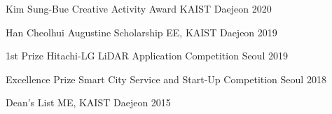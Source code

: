 \begin{cvhonors}

  \cvhonor
    {Kim Sung-Bue Creative Activity Award} %
    {KAIST} %
    {Daejeon} %
    {2020} %

  \cvhonor
    {Han Cheolhui Augustine Scholarship} %
    {EE, KAIST} %
    {Daejeon} %
    {2019} %

  \cvhonor
    {1st Prize} %
    {Hitachi-LG LiDAR Application Competition} %
    {Seoul} %
    {2019} %

  \cvhonor
    {Excellence Prize} %
    {Smart City Service and Start-Up Competition} %
    {Seoul} %
    {2018} %

  \cvhonor
    {Dean's List} %
    {ME, KAIST} %
    {Daejeon} %
    {2015} %

\end{cvhonors}

%
%
%
%

